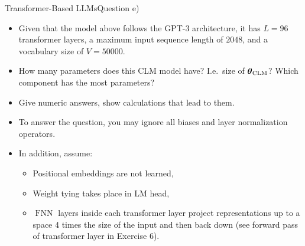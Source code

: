 \documentclass[t]{beamer}
\newcommand\op[1]{\operatorname{#1}}
\begin{document}
\begin{frame}{Transformer-Based LLMs}{Question e)}
    \begin{itemize}
        \item Given that the model above follows the GPT-3 architecture, it has
              $L = 96$ transformer layers, a maximum input sequence length of
              $2048$, and a vocabulary size of $V = 50000$.
        \item How many parameters does this CLM model have? I.e.\ size of
              $\vtheta_{\op{CLM}}$? Which component has the most parameters?
        \item Give numeric answers, show calculations that lead to them.
        \item To answer the question, you may ignore all biases and layer
              normalization operators.
        \item In addition, assume:
              \begin{itemize}
                  \item Positional embeddings are not learned,
                  \item Weight tying takes place in LM head,
                  \item $\op{FNN}$ layers inside each transformer layer
                        project representations up to a space 4 times the size
                        of the input and then back down (see forward pass of
                        transformer layer in Exercise 6).
              \end{itemize}
    \end{itemize}
\end{frame}
\end{document}
